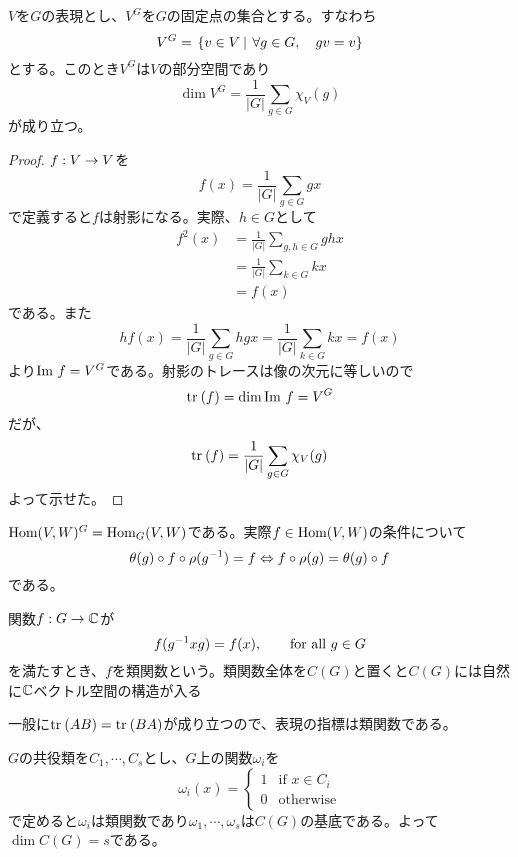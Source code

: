 \documentclass{ltjsreport}
\begin{document}
\begin{lemm}\label{fix_dim}
  $V$を$G$の表現とし、$V^G$を$G$の固定点の集合とする。すなわち
  \[
  V^G=\left.\left\{v\in V \: \right| \: \forall g\in G,\quad gv=v\right\}  
  \]
  とする。このとき$V^G$は$V$の部分空間であり
  \[
  \dim V^G=\frac{1}{|G|}\sum_{g\in G}\chi_V(g)
  \]
  が成り立つ。
\end{lemm}

\begin{proof}
  $f:V\rightarrow V$を
  \[
  f(x)=\frac{1}{|G|}\sum_{g\in G}gx
  \]
  で定義すると$f$は射影になる。実際、$h\in G$として
  \begin{align*}
    f^2(x)&=\frac{1}{|G|}\sum_{g,h\in G}ghx\\
    &=\frac{1}{|G|}\sum_{k\in G}kx\\
    &=f(x)
  \end{align*}
  である。また
  \[
  hf(x)=\frac{1}{|G|}\sum_{g\in G}hgx=\frac{1}{|G|}\sum_{k\in G}kx=f(x)
  \]
  より$\text{Im } f=V^G$である。射影のトレースは像の次元に等しいので
  \[
  \text{tr}\:(f)=\dim \text{Im } f=V^G  
  \]
  だが、
  \[
  \text{tr}\: (f)=\frac{1}{|G|}\sum_{g\in G}\chi_V(g)  
  \]
  よって示せた。
\end{proof}

\begin{eg}
  $\text{Hom}(V,W)^G=\text{Hom}_G(V,W)$である。実際$f\in \text{Hom}(V,W)$の条件について
  \[
  \theta(g)\circ f \circ \rho(g^{-1})=f\Leftrightarrow f\circ \rho(g)=\theta(g)\circ f
  \]
  である。
\end{eg}




\begin{defin}
  関数$f:G\rightarrow\mathbb{C}$が
  \[
  f(g^{-1}xg)=f(x),\qquad\text{for all $g\in G$}  
  \]
  を満たすとき、$f$を類関数という。類関数全体を$C(G)$と置くと$C(G)$には自然に$\mathbb{C}$ベクトル空間の構造が入る
\end{defin}

\begin{eg}
  一般に$\text{tr}\:(AB)=\text{tr}\:(BA)$が成り立つので、表現の指標は類関数である。
\end{eg}

\begin{eg}
  $G$の共役類を$C_1,\cdots,C_s$とし、$G$上の関数$\omega_i$を
  \[
  \omega_i(x)=\left\{\begin{array}{cl}
    1 & \text{if $x\in C_i$}\\
    0 & \text{otherwise}
  \end{array}\right.  
  \]
  で定めると$\omega_i$は類関数であり$\omega_1,\cdots,\omega_s$は$C(G)$の基底である。よって$\dim C(G)=s$である。
\end{eg}
\end{document}
